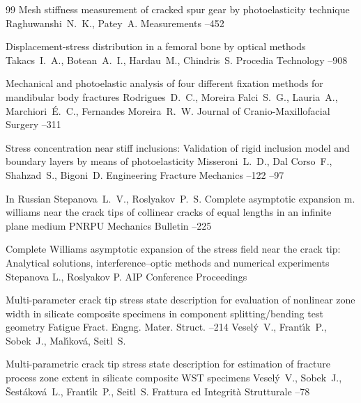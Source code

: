 \begin{thebibliography}{99}
 \paper Mesh stiffness measurement of cracked spur gear by photoelasticity technique
\by Raghuwanshi~N.~K., Patey~A.
\jour Measurements
--452

\paper Displacement-stress distribution in a femoral bone by optical methods
\by Takacs~I.~A., Botean~A.~I., Hardau~M., Chindris~S.
\jour Procedia Technology
--908


\paper Mechanical and photoelastic analysis of four different fixation methods for mandibular body fractures
\by Rodrigues~D.~C., Moreira Falci~S.~G., Lauria~A.,  Marchiori~\'E.~C., Fernandes Moreira~R.~W.
\jour Journal of Cranio-Maxillofacial Surgery
--311



\paper Stress concentration near stiff inclusions: Validation of rigid inclusion model and boundary layers by means of photoelasticity
\by  Misseroni~L.~D., Dal Corso~F., Shahzad~S., Bigoni~D.
\jour Engineering Fracture Mechanics
--122
--97

\lang In Russian
\by Stepanova~L.~V., Roslyakov~P.~S.
\paper Complete asymptotic expansion m. williams near the crack tips of collinear cracks of equal lengths in an infinite plane medium 
\jour PNRPU Mechanics Bulletin
--225

\paper Complete Williams asymptotic expansion of the stress field near the crack tip: Analytical solutions, interference–optic methods and numerical experiments
\by Stepanova L., Roslyakov P.
\jour AIP Conference Proceedings


\paper  Multi-parameter crack tip stress state description for evaluation of nonlinear zone width in silicate composite specimens in component splitting/bending test geometry
\jour Fatigue Fract. Engng. Mater. Struct.
--214
\by Vesel\'y~V.,  Frant\'{\i}k~P., Sobek~J., Mal\'{\i}kov\'a,  Seitl~S.

\paper Multi-parametric crack tip stress state description for estimation of fracture process zone extent in silicate composite WST specimens
\by Vesel\'y~V., Sobek~J., \v{S}est\'akov\'a~L., Frant\'{\i}k~P., Seitl~S.
\jour Frattura ed Integrit\`a Strutturale
--78



\end{thebibliography}
